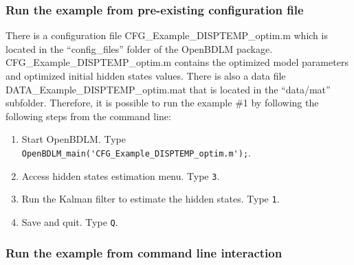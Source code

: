 \subsubsection{Run the example from pre-existing configuration file}
\label{SS:LoadConfigFileEx2}
There is a configuration file CFG\_Example\_DISPTEMP\_optim.m which is located in the ``config\_files'' folder of the OpenBDLM package.
CFG\_Example\_DISPTEMP\_optim.m contains the optimized model parameters and optimized initial hidden states values.
There is also a data file DATA\_Example\_DISPTEMP\_optim.mat that is located in the ``data/mat'' subfolder.
Therefore, it is possible to run the example \#1 by following the following steps from the \MATLAB{} command line:
\begin{enumerate}
\item Start OpenBDLM. Type \colorbox{light-gray}{\lstinline[basicstyle = \mlttfamily \small, backgroundcolor = \color{light-gray}]!OpenBDLM_main('CFG_Example_DISPTEMP_optim.m');!}.
\item Access hidden states estimation menu. Type \colorbox{light-gray}{\lstinline[basicstyle = \mlttfamily \small, backgroundcolor = \color{light-gray}]!3!}.
\item Run the Kalman filter to estimate the hidden states. Type \colorbox{light-gray}{\lstinline[basicstyle = \mlttfamily \small, backgroundcolor = \color{light-gray}]!1!}.
\item Save and quit. Type \colorbox{light-gray}{\lstinline[basicstyle = \mlttfamily \small, backgroundcolor = \color{light-gray}]!Q!}.
\end{enumerate}


\subsubsection{Run the example from command line interaction}


